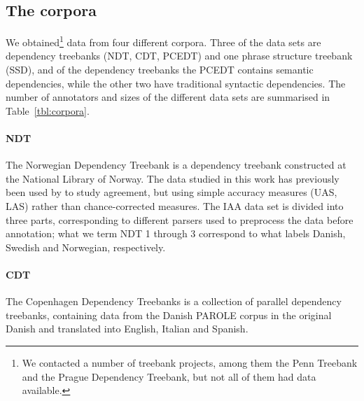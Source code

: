 \documentclass[11pt]{article}
\let\citeN=\newcite
\begin{document}
\subsection{The corpora}
We obtained\footnote{We contacted a number of treebank projects, among them
the Penn Treebank and the Prague Dependency Treebank, but not all of them had
data available.} data from four different corpora. Three of the data sets are
dependency treebanks (NDT, CDT, PCEDT) and one phrase structure treebank
(SSD), and of the dependency treebanks the PCEDT contains semantic
dependencies, while the other two have traditional syntactic dependencies. The
number of annotators and sizes of the different data sets are summarised in
Table~\ref{tbl:corpora}.

\paragraph{NDT} The Norwegian Dependency Treebank \cite{Solberg:etal14} is a
dependency treebank constructed at the National Library of Norway. The data
studied in this work has previously been used by \citeN{Skjaerholt13} to study
agreement, but using simple accuracy measures (UAS, LAS) rather than
chance-corrected measures. The IAA data set is divided into three parts,
corresponding to different parsers used to preprocess the data before
annotation; what we term NDT 1 through 3 correspond to what
\citeN{Skjaerholt13} labels Danish, Swedish and Norwegian, respectively.

\paragraph{CDT} The Copenhagen Dependency Treebanks
\cite{Buc:Kor:Mul09,Buc:Kor10} is a collection of parallel dependency
treebanks, containing data from the Danish PAROLE corpus
\cite{Keson98a,Keson98b} in the original Danish and translated into English,
Italian and Spanish.

\end{document}
